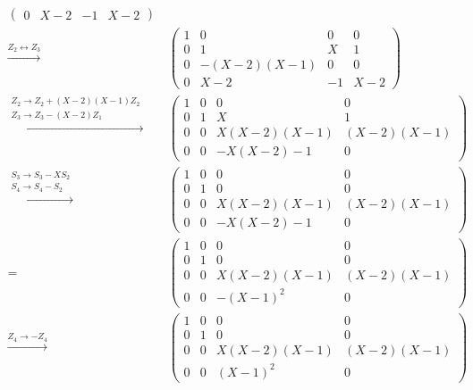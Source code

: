 \begin{align*}
\begin{pmatrix}
      0 &         X-2 &  -1 & X-2
    \end{pmatrix}
  \\
  \xrightarrow{Z_2 \leftrightarrow Z_3}&\,
    \begin{pmatrix}
      1 &           0 &   0 &   0 \\
      0 &           1 & X   &   1 \\
      0 & -(X-2)(X-1) &   0 &   0 \\
      0 &         X-2 &  -1 & X-2
    \end{pmatrix}
  \\
  \xrightarrow{\substack{Z_2 \to Z_2 + (X-2)(X-1)Z_2 \\ Z_3 \to Z_3 - (X-2) Z_1}}&\,
    \begin{pmatrix}
      1 & 0 &           0 &          0  \\
      0 & 1 &           X &          1  \\
      0 & 0 & X(X-2)(X-1) & (X-2)(X-1)  \\
      0 & 0 &   -X(X-2)-1 &          0
    \end{pmatrix}
  \\
  \xrightarrow{\substack{S_3 \to S_3 - X S_2 \\ S_4 \to S_4 - S_2}}&\,
    \begin{pmatrix}
      1 & 0 &           0 &          0  \\
      0 & 1 &           0 &          0  \\
      0 & 0 & X(X-2)(X-1) & (X-2)(X-1)  \\
      0 & 0 &   -X(X-2)-1 &          0
    \end{pmatrix}
  \\
  =&\,
    \begin{pmatrix}
      1 & 0 &           0 &          0  \\
      0 & 1 &           0 &          0  \\
      0 & 0 & X(X-2)(X-1) & (X-2)(X-1)  \\
      0 & 0 &    -(X-1)^2 &          0
    \end{pmatrix}
  \\
  \xrightarrow{Z_4 \to -Z_4}&\,
    \begin{pmatrix}
      1 & 0 &           0 &          0  \\
      0 & 1 &           0 &          0  \\
      0 & 0 & X(X-2)(X-1) & (X-2)(X-1)  \\
      0 & 0 &     (X-1)^2 &          0
    \end{pmatrix}

\end{align*}

